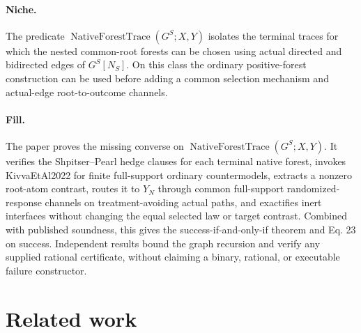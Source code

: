 \documentclass{article}
\begin{document}
\paragraph{Niche.} The predicate \(\operatorname{NativeForestTrace}(G^S;X,Y)\) isolates the terminal traces for which the nested common-root forests can be chosen using actual directed and bidirected edges of \(G^S[N_S]\). On this class the ordinary positive-forest construction can be used before adding a common selection mechanism and actual-edge root-to-outcome channels.

\paragraph{Fill.} The paper proves the missing converse on \(\operatorname{NativeForestTrace}(G^S;X,Y)\). It verifies the Shpitser--Pearl hedge clauses for each terminal native forest, invokes KivvaEtAl2022 for finite full-support ordinary countermodels, extracts a nonzero root-atom contrast, routes it to \(Y_N\) through common full-support randomized-response channels on treatment-avoiding actual paths, and exactifies inert interfaces without changing the equal selected law or target contrast. Combined with published soundness, this gives the success-if-and-only-if theorem and Eq. 23 on success. Independent results bound the graph recursion and verify any supplied rational certificate, without claiming a binary, rational, or executable failure constructor.

\section{Related work}
\end{document}
